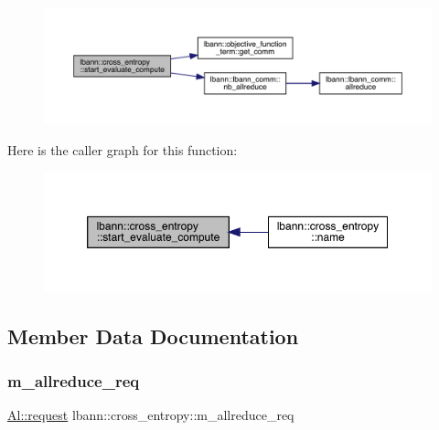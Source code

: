 \begin{figure}[H]
\begin{center}
\leavevmode
\includegraphics[width=350pt]{classlbann_1_1cross__entropy_a5167b7709499516c6a4dbebfc561f6a7_cgraph}
\end{center}
\end{figure}
Here is the caller graph for this function\+:\nopagebreak
\begin{figure}[H]
\begin{center}
\leavevmode
\includegraphics[width=350pt]{classlbann_1_1cross__entropy_a5167b7709499516c6a4dbebfc561f6a7_icgraph}
\end{center}
\end{figure}


\subsection{Member Data Documentation}
\mbox{\label{classlbann_1_1cross__entropy_a982d913d892cd9043325e2cc6a77f039}} 
\subsubsection{\texorpdfstring{m\+\_\+allreduce\+\_\+req}{m\_allreduce\_req}}
{\footnotesize\ttfamily \hyperlink{structlbann_1_1Al_1_1request}{Al\+::request} lbann\+::cross\+\_\+entropy\+::m\+\_\+allreduce\+\_\+req\hspace{0.3cm}{\ttfamily [private]}}

